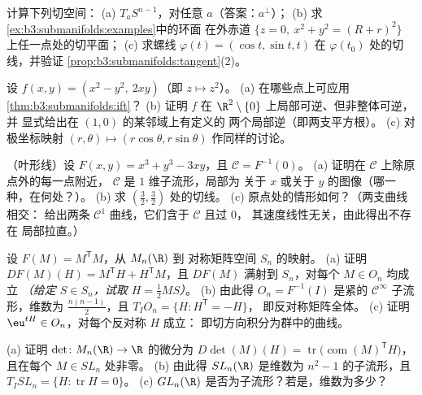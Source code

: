 \begin{exercise}[$\star$]\label{exo:b3:submanifolds:2}
计算下列切空间：
(a) $T_aS^{n-1}$，对任意 $a$（答案：$a^\perp$）；
(b) 求\cref{ex:b3:submanifolds:examples}中的环面
在外赤道
$\{z = 0,\ x^2 + y^2 = (R + r)^2\}$ 上任一点处的切平面；
(c) 求螺线 $\varphi(t) = (\cos t,
\sin t, t)$ 在 $\varphi(t_0)$ 处的切线，并验证
\cref{prop:b3:submanifolds:tangent}(2)。
\end{exercise}

\begin{exercise}[$\star\star$]\label{exo:b3:submanifolds:3}
设 $f(x, y) = (x^2 - y^2,\ 2xy)$（即 $z \mapsto z^2$）。
(a) 在哪些点上可应用\cref{thm:b3:submanifolds:ift}？
(b) 证明 $f$ 在
$\R^2\setminus\{0\}$ 上局部可逆、但非整体可逆，并
显式给出在 $(1, 0)$ 的某邻域上有定义的
两个局部逆（即两支平方根）。
(c) 对极坐标映射 $(r,
\theta) \mapsto (r\cos\theta, r\sin\theta)$ 作同样的讨论。
\end{exercise}

\begin{exercise}[$\star\star$]\label{exo:b3:submanifolds:4}
（叶形线）设 $F(x,y) = x^3 + y^3 - 3xy$，且 $\mathcal C =
F^{-1}(0)$。
(a) 证明在 $\mathcal C$ 上除原点外的每一点附近，
$\mathcal C$ 是 $1$ 维子流形，局部为
关于 $x$ 或关于 $y$ 的图像（哪一种，在何处？）。
(b) 求 $(\frac32, \frac32)$ 处的切线。
(c) 原点处的情形如何？（两支曲线相交：
给出两条 $\mathcal C^1$ 曲线，它们含于 $\mathcal C$ 且过 $0$，
其速度线性无关，由此得出不存在
局部拉直。）
\end{exercise}

\begin{exercise}[$\star\star$]\label{exo:b3:submanifolds:5}
设 $F(M) = M^{\mathsf T}M$，从 $M_n(\R)$ 到
对称矩阵空间 $S_n$ 的映射。
(a) 证明 $DF(M)(H) = M^{\mathsf T}H + H^{\mathsf T}M$，且
$DF(M)$ 满射到 $S_n$，对每个 $M \in O_n$ 均成立
\emph{（给定 $S \in S_n$，试取 $H = \frac12MS$）}。
(b) 由此得 $O_n = F^{-1}(I)$ 是紧的
$\mathcal C^\infty$ 子流形，维数为
$\frac{n(n-1)}2$，且 $T_IO_n = \{H : H^{\mathsf T} = -H\}$，
即反对称矩阵全体。
(c) 证明 $\eu^{tH} \in O_n$，对每个反对称 $H$ 成立：
即切方向积分为群中的曲线。
\end{exercise}

\begin{exercise}[$\star\star$]\label{exo:b3:submanifolds:6}
(a) 证明 $\det \colon M_n(\R) \to \R$ 的微分为
$D\det(M)(H) = \operatorname{tr}\bigl(\operatorname{com}(M)
^{\mathsf T}H\bigr)$，且在每个 $M \in SL_n$ 处非零。
(b) 由此得 $SL_n(\R)$ 是维数为
$n^2 - 1$ 的子流形，且 $T_ISL_n = \{H : \operatorname{tr}H = 0\}$。
(c) $GL_n(\R)$ 是否为子流形？若是，维数为多少？
\end{exercise}


